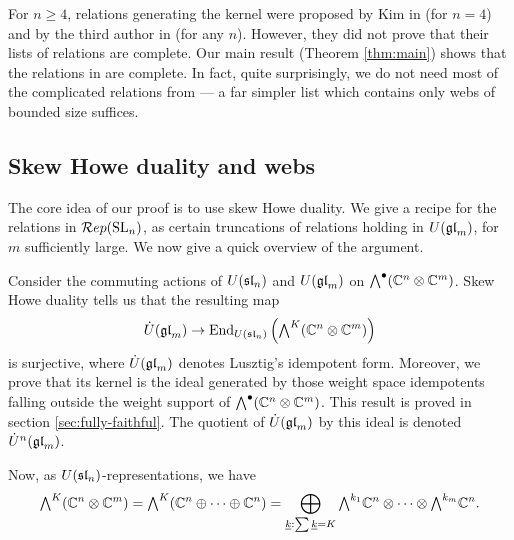 \documentclass[11pt]{amsart}
\begin{document}
For $n \geq 4$, relations generating the kernel were proposed by Kim in \cite{math.QA/0310143} (for $n=4$) and by the third author in \cite{0704.1503} (for any $n$). However, they did not prove that their lists of relations are complete.  Our main result (Theorem \ref{thm:main}) shows that the relations in \cite{0704.1503} are complete.  In fact, quite surprisingly, we do not need most of the complicated relations from \cite{0704.1503} --- a far simpler list which contains only webs of bounded size suffices.

\subsection{Skew Howe duality and webs}
The core idea of our proof is to use skew Howe duality.  We give a recipe for the relations in $\Rep(\SL_n)$, as certain truncations of relations holding in $U(\gl_m)$, for $m$ sufficiently large. We now give a quick overview of the argument.

Consider the commuting actions of $U(\sl_n)$ and $U(\gl_m)$ on $\Alt{\bullet}{}(\mathbb{C}^n \tensor \mathbb{C}^m)$.  Skew Howe duality tells us that the resulting map
\begin{equation}\label{eq:2}
\dot{U}(\gl_m) \rightarrow {\rm End}_{U(\sl_n)}\left(\Alt{K}{}(\bC^n \tensor \bC^m)\right)
\end{equation}
is surjective, where $\dot{U}(\gl_m)$ denotes Lusztig's idempotent form. Moreover, we prove that its kernel is the ideal generated by those weight space idempotents falling outside the weight support of $\Alt{\bullet}{}(\mathbb C^n \tensor \mathbb C^m)$.  This result is proved in section \ref{sec:fully-faithful}. The quotient of $\dot{U}(\gl_m)$ by this ideal is denoted $\dot{U}^n(\gl_m)$.

Now, as $U(\sl_n)$-representations, we have
\begin{equation}\label{eq:3}
\Alt{K}{}(\mathbb C^n \tensor \mathbb C^m)  = \Alt{K}{}(\bC^n \directSum \cdots \directSum \bC^n) = \DirectSum_{\underline{k}: \sum \underline{k} = K} \Alt{k_1}{} \bC^n \tensor \cdots \tensor \Alt{k_m}{} \bC^n.
\end{equation}
\end{document}
